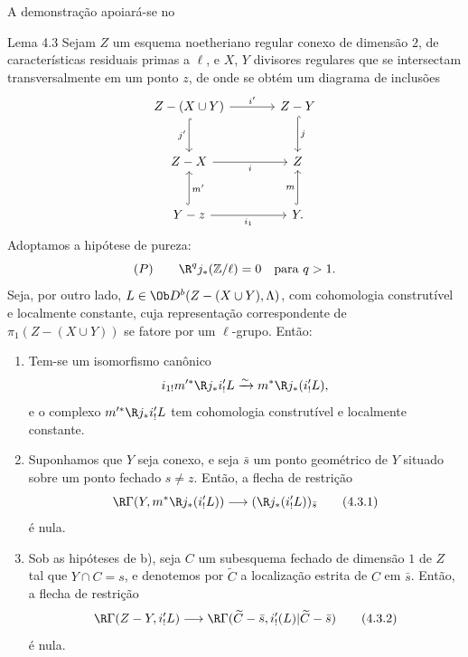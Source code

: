 A demonstração apoiará-se no

\begin{statement}{Lema 4.3}
Sejam $Z$ um esquema noetheriano regular conexo de dimensão $2$, de características residuais primas a $\ell$, e $X$, $Y$ divisores regulares que se intersectam transversalmente em um ponto $z$, de onde se obtém um diagrama de inclusões
\[
\begin{tikzcd}[column sep=large,row sep=large]
Z-(X\cup Y) \arrow[r,"i'"] \arrow[d,hook,"j'"'] & Z-Y \arrow[d,hook,"j"]\\
Z-X \arrow[r,"i"'] & Z\\
Y-z \arrow[r,"i_1"'] \arrow[u,hook,"m'"'] & Y \arrow[u,hook,"m"] .
\end{tikzcd}
\]
Adoptamos a hipótese de pureza:
\[
(P)\qquad \R^qj_*(\mathbb Z/\ell)=0\quad\text{para }q>1.
\]
Seja, por outro lado, $L\in\Ob D^b(Z-(X\cup Y),\Lambda)$, com cohomologia construtível e localmente constante, cuja representação correspondente de $\pi_1(Z-(X\cup Y))$ se fatore por um $\ell$-grupo. Então:
\begin{enumerate}[label=\alph*)]
\item Tem-se um isomorfismo canônico
\[
i_{1!}m'^*\R j_*i'_!L\xrightarrow{\sim} m^*\R j_*(i'_!L),
\]
e o complexo $m'^*\R j_*i'_!L$ tem cohomologia construtível e localmente constante.
\item Suponhamos que $Y$ seja conexo, e seja $\bar s$ um ponto geométrico de $Y$ situado sobre um ponto fechado $s\ne z$. Então, a flecha de restrição
\begin{equation}
\R\Gamma(Y,m^*\R j_*(i'_!L))\longrightarrow (\R j_*(i'_!L))_{\bar s}
\tag{4.3.1}
\end{equation}
é nula.
\item Sob as hipóteses de b), seja $C$ um subesquema fechado de dimensão $1$ de $Z$ tal que $Y\cap C=s$, e denotemos por $\widetilde C$ a localização estrita de $C$ em $\bar s$. Então, a flecha de restrição
\begin{equation}
\R\Gamma(Z-Y,i'_!L)
\longrightarrow
\R\Gamma(\widetilde C-\bar s,i'_!(L)|\widetilde C-\bar s)
\tag{4.3.2}
\end{equation}
é nula.
\end{enumerate}
\end{statement}
